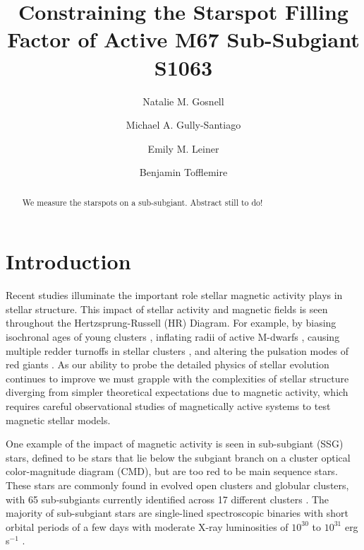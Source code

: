 \documentclass[trackchanges]{aastex631}
\begin{document}

\title{Constraining the Starspot Filling Factor of Active M67 Sub-Subgiant S1063}

\author{Natalie M. Gosnell}
\author{Michael A. Gully-Santiago}
\author{Emily M. Leiner}
\author{Benjamin Tofflemire}


\begin{abstract}

We measure the starspots on a sub-subgiant. Abstract still to do!

\end{abstract}



\section{Introduction}\label{sec:intro}
Recent studies illuminate the important role stellar magnetic activity plays in stellar structure. This impact of stellar activity and magnetic fields is seen throughout the Hertzsprung-Russell (HR) Diagram. For example, by biasing isochronal ages of young clusters \citep{somers15}, inflating radii of active M-dwarfs \citep{2010AJ....140.1158T,2010ApJ...718..502M,2019MNRAS.483.1125J}, causing multiple redder turnoffs in stellar clusters \citep{2009MNRAS.398L..11B,2019ApJ...876..113S}, and altering the pulsation modes of red giants \citep{2020A&A...639A..63G}. As our ability to probe the detailed physics of stellar evolution continues to improve we must grapple with the complexities of stellar structure diverging from simpler theoretical expectations due to magnetic activity, which requires careful observational studies of magnetically active systems to test magnetic stellar models.

One example of the impact of magnetic activity is seen in sub-subgiant (SSG) stars, defined to be stars that lie below the subgiant branch on a cluster optical color-magnitude diagram (CMD), but are too red to be main sequence stars. These stars are commonly found in evolved open clusters and globular clusters, with 65 sub-subgiants currently identified across 17 different clusters \citep{geller17}. The majority of sub-subgiant stars are single-lined spectroscopic binaries with short orbital periods of a few days with moderate X-ray luminosities of $10^{30}$ to $10^{31}$ erg s$^{-1}$ \citep[and references therein]{geller17}.
\end{document}
